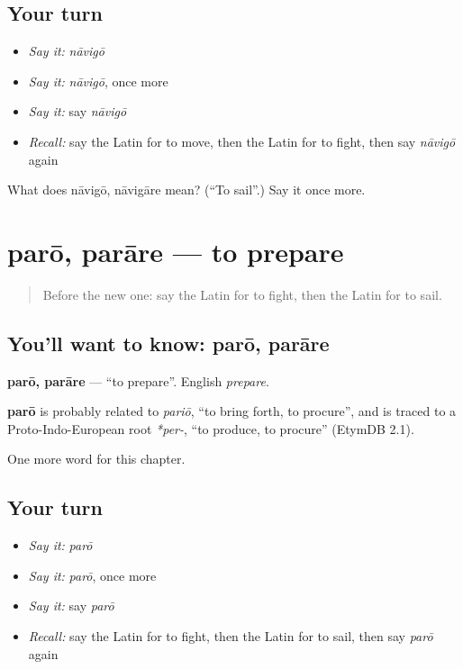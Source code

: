 \subsection*{Your turn}
\begin{itemize}
\raggedright
  \item \emph{Say it:} \emph{nāvigō}
  \item \emph{Say it:} \emph{nāvigō}, once more
  \item \emph{Say it:} say \emph{nāvigō}
  \item \emph{Recall:} say the Latin for to move, then the Latin for to fight, then say \emph{nāvigō} again
\end{itemize}

\begin{tcolorbox}[breakable,colback=teal!4,colframe=teal!35!black,title={Before you move on}]
What does nāvigō, nāvigāre mean? (\textquotedblleft{}To sail\textquotedblright{}.) Say it once more.
\end{tcolorbox}
\section[parō, parāre]{parō, parāre — to prepare}

\label{lesson:LA-C100-paro}



\begin{quote}
Before the new one: say the Latin for to fight, then the Latin for to sail.
\end{quote}

\subsection*{You'll want to know: parō, parāre}
\textbf{parō, parāre} — \textquotedblleft{}to prepare\textquotedblright{}. English \emph{prepare}.

\begin{cousinweb}
\textbf{parō} is probably related to \emph{pariō}, \textquotedblleft{}to bring forth, to procure\textquotedblright{}, and is traced to a Proto-Indo-European root \emph{*per-}, \textquotedblleft{}to produce, to procure\textquotedblright{} (EtymDB 2.1).
\end{cousinweb}

\begin{grammarlens}[title={What you've built}]
One more word for this chapter.
\end{grammarlens}

\subsection*{Your turn}
\begin{itemize}
\raggedright
  \item \emph{Say it:} \emph{parō}
  \item \emph{Say it:} \emph{parō}, once more
  \item \emph{Say it:} say \emph{parō}
  \item \emph{Recall:} say the Latin for to fight, then the Latin for to sail, then say \emph{parō} again
\end{itemize}

